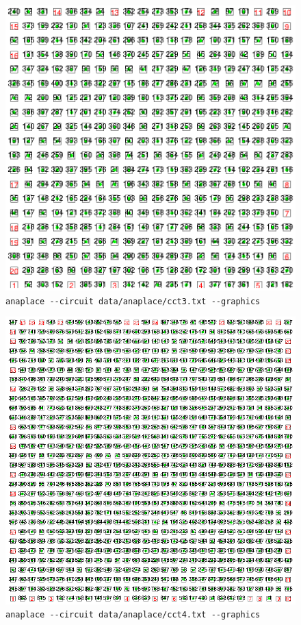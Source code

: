 \documentclass[11pt]{article}
\begin{document}
\begin{figure}[H]
\centering
\includegraphics[clip, viewport=171 244 480 548, width=\linewidth]{assets/lab2/cct3-legalized.ps}
\cprotect\caption{\small\verb|anaplace --circuit data/anaplace/cct3.txt --graphics|}
\end{figure}
\begin{figure}[H]
\centering
\includegraphics[clip, viewport=196 269 454 523, width=\linewidth]{assets/lab2/cct4-legalized.ps}
\cprotect\caption{\small\verb|anaplace --circuit data/anaplace/cct4.txt --graphics|}
\end{figure}
\end{document}
